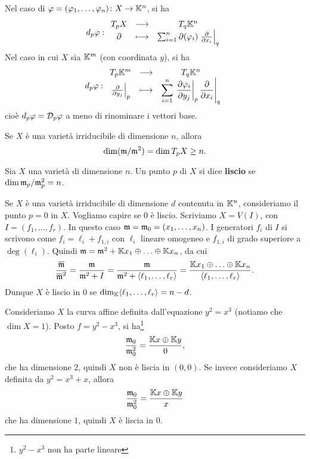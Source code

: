 \begin{remark}
Nel caso di $\varphi=(\varphi_1,\ldots,\varphi_n)\colon X \to \mathbb{K}^n$, si ha \[d_p\varphi:\begin{array}{ccc} {T_pX} & \longrightarrow & {T_q \mathbb{K}^n}\\ {\partial} & \longmapsto & {\sum_{i=1}^n \partial(\varphi_i)\left.\frac{\partial}{\partial x_i}\right\lvert_q} \end{array}\]
Nel caso in cui $X$ sia $\mathbb{K}^m$ (con coordinata $y$), si ha
\[d_p\varphi:\begin{array}{ccc} {T_p\mathbb{K}^m} & \longrightarrow & {T_q \mathbb{K}^n}\\ {\left.\frac{\partial}{\partial y_j}\right\lvert_p} & \longmapsto & {\displaystyle\sum_{i=1}^n \left.\left.\frac{\partial \varphi_i}{\partial y_j} \right\lvert_p\frac{\partial}{\partial x_i}\right\lvert_q} \end{array}\]
cio\`e $d_p\varphi=\mathcal{D}_p\varphi$ a meno di rinominare i vettori base.
\end{remark}



\begin{theorem}
    Se $X$ è una varietà irriducibile di dimensione $n$, allora \[\dim(\mathfrak{m}/\mathfrak{m}^2)=\dim T_pX \ge n.\]
\end{theorem}

\begin{definition}
    Sia $X$ una varietà di dimensione $n$. Un punto $p$ di $X$ si dice \textbf{liscio} se $\dim \mathfrak{m}_p/\mathfrak{m}_p^2 =n$.
\end{definition}

\begin{remark}
Se $X$ è una varietà irriducibile di dimensione $d$ contenuta in $\mathbb{K}^n$, consideriamo il punto $p=0$ in $X$. Vogliamo capire se $0$ è liscio. Scriviamo $X=V(I)$, con $I=(f_1,\ldots,f_r)$. In questo caso $\mathfrak{m}=\mathfrak{m}_0=(x_1,\ldots,x_n)$. I generatori $f_i$ di $I$ si scrivono come $f_i=\ell_i+f_{1,i}$ con $\ell_i$ lineare omogeneo e $f_{1,i}$ di grado superiore a $\deg(\ell_i)$. Quindi $\mathfrak{m}=\mathfrak{m}^2+\mathbb{K} x_1\oplus \ldots \oplus \mathbb{K} x_n$, da cui \[\frac{\overline{\mathfrak{m}}}{\overline{\mathfrak{m}}^2}=\frac{\mathfrak{m}}{\mathfrak{m}^2+I}=\frac{\mathfrak{m}}{\mathfrak{m}^2+\langle
\ell_1,\ldots,\ell_r\rangle}=\frac{\mathbb{K} x_1\oplus \ldots \oplus \mathbb{K} x_n}{\langle
\ell_1,\ldots,\ell_r\rangle}.\] Dunque $X$ è liscio in $0$ se $\dim_{\mathbb{K}}\langle
\ell_1,\ldots,\ell_r\rangle=n-d$.
\end{remark}

\begin{example}
    Consideriamo $X$ la curva affine definita dall'equazione $y^2=x^3$ (notiamo che $\dim X=1$). Posto $f=y^2-x^3$, si ha\footnote{$y^2-x^3$ non ha parte lineare}
    \[\frac{\mathfrak{m}_0}{\mathfrak{m}_0^2}=\frac{\mathbb{K} x\oplus \mathbb{K} y}{0},\] 
    che ha dimensione $2$, quindi $X$ non è liscia in $(0,0)$. Se invece consideriamo $X$ definita da $y^2=x^3+x$, allora 
    \[\frac{\mathfrak{m}_0}{\mathfrak{m}_0^2}=\frac{\mathbb{K} x\oplus \mathbb{K} y}{x}\]
    che ha dimensione $1$, quindi $X$ è liscia in $0$.
\end{example}

